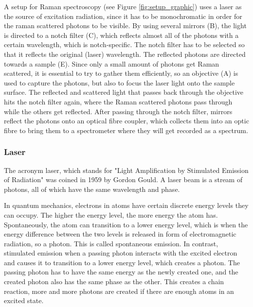 A setup for Raman spectroscopy (see Figure \ref{fig:setup_graphic}) uses a laser as the source of excitation radiation, since it has to be monochromatic in order for the raman scattered photons to be visible. By using several mirrors (B), the light is directed to a notch filter (C), which reflects almost all of the photons with a certain wavelength, which is notch-specific. The notch filter has to be selected so that it reflects the original (laser) wavelength. The reflected photons are directed towards a sample (E). Since only a small amount of photons get Raman scattered, it is essential to try to gather them efficiently, so an objective (A) is used to capture the photons, but also to focus the laser light onto the sample surface. The reflected and scattered light that passes back through the objective hits the notch filter again, where the Raman scattered photons pass through while the others get reflected. After passing through the notch filter, mirrors reflect the photons onto an optical fibre coupler, which collects them into an optic fibre to bring them to a spectrometer where they will get recorded as a spectrum.

\newpage

\subsubsection{Laser}
The acronym laser, which stands for "Light Amplification by Stimulated Emission of Radiation" was coined in 1959 by Gordon Gould.
A laser beam is a stream of photons, all of which have the same wavelength and phase. 

\bigskip

In quantum mechanics, electrons in atoms have certain discrete energy levels they can occupy. The higher the energy level, the more energy the atom has. Spontaneously, the atom can transition to a lower energy level, which is when the energy difference between the two levels is released in form of electromagnetic radiation, so a photon. This is called spontaneous emission. In contrast, stimulated emission when a passing photon interacts with the excited electron and causes it to transition to a lower energy level, which creates a photon. The passing photon has to have the same energy as the newly created one, and the created photon also has the same phase as the other. This creates a chain reaction, more and more photons are created if there are enough atoms in an excited state.\cite{wikilaser} \cite{wikistimlaser}

\bigskip


